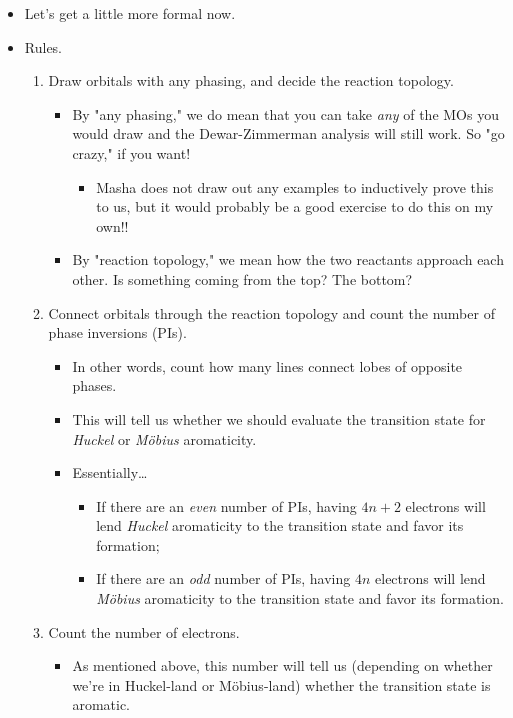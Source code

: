 \documentclass[../notes.tex]{subfiles}
\begin{document}
\begin{itemize}
    \item Let's get a little more formal now.
    \item Rules.
    \begin{enumerate}
        \item Draw orbitals with any phasing, and decide the reaction topology.
        \begin{itemize}
            \item By "any phasing," we do mean that you can take \emph{any} of the MOs you would draw and the Dewar-Zimmerman analysis will still work. So "go crazy," if you want!
            \begin{itemize}
                \item Masha does not draw out any examples to inductively prove this to us, but it would probably be a good exercise to do this on my own!!
            \end{itemize}
            \item By "reaction topology," we mean how the two reactants approach each other. Is something coming from the top? The bottom?
        \end{itemize}
        \item Connect orbitals through the reaction topology and count the number of phase inversions (PIs).
        \begin{itemize}
            \item In other words, count how many lines connect lobes of opposite phases.
            \item This will tell us whether we should evaluate the transition state for \emph{Huckel} or \emph{M\"{o}bius} aromaticity.
            \item Essentially\dots
            \begin{itemize}
                \item If there are an \emph{even} number of PIs, having $4n+2$ electrons will lend \emph{Huckel} aromaticity to the transition state and favor its formation;
                \item If there are an \emph{odd} number of PIs, having $4n$ electrons will lend \emph{M\"{o}bius} aromaticity to the transition state and favor its formation.
            \end{itemize}
        \end{itemize}
        \item Count the number of electrons.
        \begin{itemize}
            \item As mentioned above, this number will tell us (depending on whether we're in Huckel-land or M\"{o}bius-land) whether the transition state is aromatic.

\end{itemize}
\end{enumerate}
\end{itemize}
\end{document}
